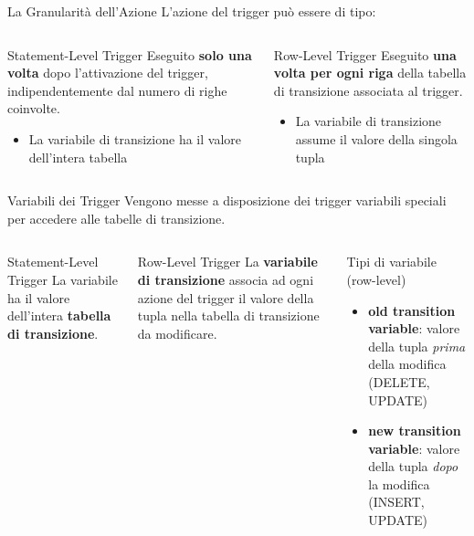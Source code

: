 \documentclass[aspectratio=169]{beamer}
\begin{document}
\begin{frame}{La Granularità dell'Azione}
  L'azione del trigger può essere di tipo:
  \vspace{0.3cm}
  \begin{columns}[T]
      \begin{block}{Statement-Level Trigger}
        Eseguito \textbf{solo una volta} dopo l'attivazione del trigger,
        indipendentemente dal numero di righe coinvolte.
        \vspace{0.2cm}
        \begin{itemize}
          \item La variabile di transizione ha il valore dell'intera tabella
        \end{itemize}
      \end{block}
      \begin{alertblock}{Row-Level Trigger}
        Eseguito \textbf{una volta per ogni riga} della tabella di transizione
        associata al trigger.
        \vspace{0.2cm}
        \begin{itemize}
          \item La variabile di transizione assume il valore della singola tupla
        \end{itemize}
      \end{alertblock}
  \end{columns}
\end{frame}

\begin{frame}{Variabili dei Trigger}
  Vengono messe a disposizione dei trigger variabili speciali per accedere alle
  tabelle di transizione.
  \vspace{0.3cm}
  \begin{columns}[T]
      \begin{block}{Statement-Level Trigger}
        La variabile ha il valore dell'intera \textbf{tabella di transizione}.
      \end{block}
      \vspace{0.3cm}
      \begin{block}{Row-Level Trigger}
        La \textbf{variabile di transizione} associa ad ogni azione del trigger
        il valore della tupla nella tabella di transizione da modificare.
      \end{block}
      \begin{exampleblock}{Tipi di variabile (row-level)}
        \begin{itemize}
          \item \textbf{old transition variable}: valore della tupla \emph{prima}
            della modifica (DELETE, UPDATE)
          \item \textbf{new transition variable}: valore della tupla \emph{dopo}
            la modifica (INSERT, UPDATE)
        \end{itemize}
      \end{exampleblock}
  \end{columns}
\end{frame}
\end{document}
